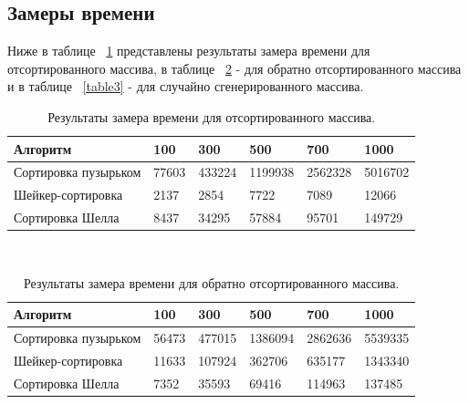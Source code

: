 \documentclass[a4paper]{article}
\begin{document}
	\subsection {Замеры времени}
	Ниже в таблице ~\ref{table1} представлены результаты замера времени для отсортированного массива, в таблице ~\ref{table2} - для обратно отсортированного массива и в таблице ~\ref{table3} - для случайно сгенерированного массива.
	\begin{table}[h]
		\caption{\label{table1} Результаты замера времени для отсортированного массива.}
		\begin{center}
			\begin{tabular}{|p{200pt}|p{50pt}|p{50pt}|p{50pt}|p{50pt} |p{50pt}|}
				\hline
				\textbf{Алгоритм} & \textbf{100} & \textbf{300} &\textbf{500} & \textbf{700} & \textbf{1000}\\ \hline
				Сортировка пузырьком & 77603 & 433224  & 1199938 &2562328 & 5016702\\	\hline
				Шейкер-сортировка & 2137 & 2854 & 7722 & 7089 & 12066\\ \hline
				Сортировка Шелла & 8437 & 34295 & 57884 & 95701 & 149729\\ \hline
			\end{tabular}
		\end{center}
	\end{table}\\
	\begin{table}[h]
	\caption{\label{table2} Результаты замера времени для обратно отсортированного массива.}
	\begin{center}
		\begin{tabular}{|p{200pt}|p{50pt}|p{50pt}|p{50pt}|p{50pt} |p{50pt}|}
			\hline
			\textbf{Алгоритм} & \textbf{100} & \textbf{300} &\textbf{500} & \textbf{700} & \textbf{1000}\\ \hline
			Сортировка пузырьком &56473 & 477015  & 1386094 & 2862636 & 5539335 \\	\hline
			Шейкер-сортировка & 11633 &107924 & 362706 & 635177 &  1343340\\ \hline
			Сортировка Шелла & 7352 & 35593 & 69416 &114963 & 137485\\ \hline
		\end{tabular}
	\end{center}
\end{table}\\
\end{document}
